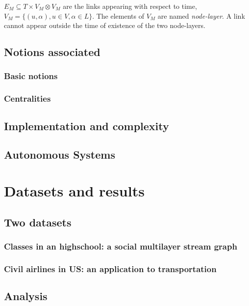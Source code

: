\documentclass{svproc}
\begin{document}
   $E_M \subseteq T\times V_M \otimes V_M$ are the links appearing with respect to time,  $V_M = \{ (u,\alpha), u\in V, \alpha \in L\}$. The elements of $V_M$ are named {\em node-layer}. A link cannot appear outside the time of existence of the two node-layers.
   
\subsection{Notions associated}
%
\subsubsection{Basic notions}
%
\subsubsection{Centralities}
%
\subsection{Implementation and complexity}
%
\subsection{Autonomous Systems}
%

\section{Datasets and results}
%
\subsection{Two datasets}
%
\subsubsection{Classes in an highschool: a social multilayer stream graph}
%
\subsubsection{Civil airlines in US: an application to transportation}
%
\subsection{Analysis}
%
\end{document}
